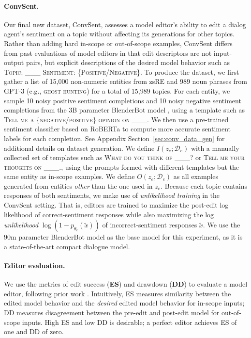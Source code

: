 \documentclass{article}
\newcommand{\editdata}{\mathcal{D}_{e}}
\newcommand{\rawstring}[1]{\textsc{\footnotesize #1}}
\newcommand{\thetae}{{\theta_e}}
\newcommand{\ze}[1][]{z_e^{#1}}
\begin{document}
\paragraph{ConvSent.} Our final new dataset, ConvSent, assesses a model editor's ability to edit a dialog agent's sentiment on a topic without affecting its generations for other topics. Rather than adding hard in-scope or out-of-scope examples, ConvSent differs from past evaluations of model editors in that edit descriptors are not input-output pairs, but explicit descriptions of the desired model behavior such as \rawstring{Topic: \_\_\_ Sentiment: \{Positive/Negative\}}. To produce the dataset, we first gather a list of 15,000 non-numeric entities from zsRE \citep{levy2017zero,Cao2021EditingFK} and 989 noun phrases from GPT-3 \citep{brown2020language} (e.g., \rawstring{ghost hunting}) for a total of 15,989 topics. For each entity, we sample 10 noisy positive sentiment completions and 10 noisy negative sentiment completions from the 3B parameter BlenderBot model \citep{roller2021recipes}, using a template such as \rawstring{Tell me a \{negative/positive\} opinion on \_\_\_.} We then use a pre-trained sentiment classifier \citep{heitmann2020} based on RoBERTa \citep{liu2019robustly} to compute more accurate sentiment labels for each completion. See Appendix Section~\ref{sec:conv_data_gen} for additional details on dataset generation. We define $I(\ze; \editdata)$ with a manually collected set of templates such as \rawstring{What do you think of \_\_\_?} or \rawstring{Tell me your thoughts on \_\_\_.}, using the prompts formed with different templates but the same entity as in-scope examples. We define $O(\ze; \editdata)$ as all examples generated from entities \textit{other} than the one used in $\ze$. Because each topic contains responses of both sentiments, we make use of \textit{unlikelihood training} \citep{li2020dont} in the ConvSent setting. That is, editors are trained to maximize the post-edit log likelihood of correct-sentiment responses while also maximizing the log \textit{unlikelihood} $\log(1 - p_\thetae(\tilde x))$ of incorrect-sentiment responses $\tilde x$. We use the 90m parameter BlenderBot model \citep{roller2021recipes} as the base model for this experiment, as it is a state-of-the-art compact dialogue model.

\paragraph{Editor evaluation.} 
We use the metrics of edit success (\textbf{ES}) and drawdown (\textbf{DD}) to evaluate a model editor, following prior work \citep{Sinitsin2020Editable,Cao2021EditingFK,mitchell2021fast,hase2021language}. Intuitively, ES measures similarity between the edited model behavior and the \textit{desired} edited model behavior for in-scope inputs; DD measures disagreement between the pre-edit and post-edit model for out-of-scope inputs. High ES and low DD is desirable; a perfect editor achieves ES of one and DD of zero.%
\end{document}
